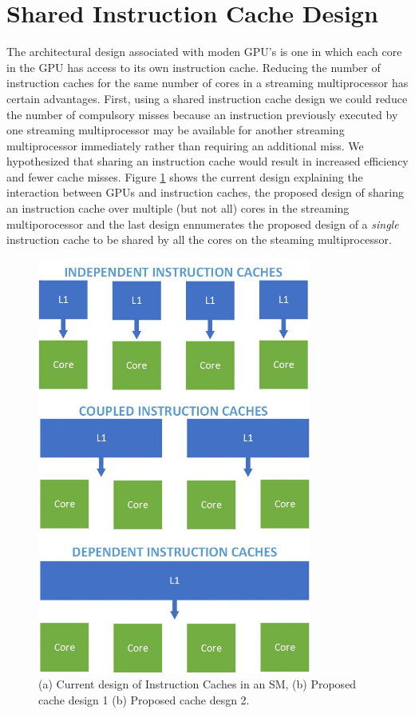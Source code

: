 \section{Shared Instruction Cache Design}

The architectural design associated with moden GPU's is one in which each core in the GPU has access to its own instruction cache. Reducing the number of instruction caches for the same number of cores in a streaming multiprocessor has certain advantages. First, using a shared instruction cache design we could reduce the number of compulsory misses because an instruction previously executed by one streaming multiprocessor may be available for another streaming multiprocessor immediately rather than requiring an additional miss. We hypothesized that sharing an instruction cache would result in increased efficiency and fewer cache misses. Figure \ref{fig:propDesign} shows the current design explaining the interaction between GPUs and instruction caches, the proposed design of sharing an instruction cache over multiple (but not all) cores in the streaming multiporocessor and the last design ennumerates the proposed design of a \emph{single} instruction cache to be shared by all the cores on the steaming multiprocessor. 

\begin{figure}[ht!]
\centering
\includegraphics[width=90mm]{InstructionCacheDesignSketches.jpg}
\caption{(a) Current design of Instruction Caches in an SM, (b) Proposed cache design 1 (b) Proposed cache desgn 2.}
\label{fig:propDesign}
\end{figure}


